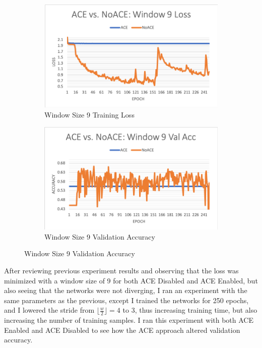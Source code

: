 \documentclass[12pt]{article}
\begin{document}
\begin{figure}[t]
	\begin{subfigure}{0.45\linewidth}
		\includegraphics[width=\linewidth]{acevnoace-window9-loss.png}
		\caption{Window Size 9 Training Loss}
	\end{subfigure}
	\hfill
	\begin{subfigure}{0.45\linewidth}
		\includegraphics[width=\linewidth]{acevnoace-window9-valacc.png}
		\caption{Window Size 9 Validation Accuracy}		
	\end{subfigure}
	

\end{figure}


After reviewing previous experiment results and observing that the loss was minimized with a window size of 9 for both ACE Disabled and ACE Enabled, but also seeing that the networks were not diverging, I ran an experiment with the same parameters as the previous, except I trained the networks for 250 epochs, and I lowered the stride from $\lfloor\frac{w}{2}\rfloor = 4$ to 3, thus increasing training time, but also increasing the number of training samples. 
%
I ran this experiment with both ACE Enabled and ACE Disabled to see how the ACE approach altered validation accuracy. 
\end{document}

